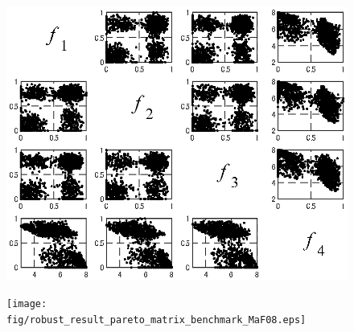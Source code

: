 \begin{figure}[htbp]
\begin{center}
\begin{minipage}{0.45\textwidth}
\begin{center}
            \end{center}
        \end{minipage}
        \begin{minipage}{0.45\textwidth}
            \begin{center}
                \includegraphics[width=1\textwidth,keepaspectratio=true]{fig/robust_result_pareto_matrix_benchmark_DTLZ7.eps}\\\vspace{-5mm}{\small (e)DTLZ7問題}
            \end{center}
        \end{minipage}
        \begin{minipage}{0.45\textwidth}
            \begin{center}
                \texttt{[image: fig/robust\_result\_pareto\_matrix\_benchmark\_MaF08.eps]}\\\vspace{-5mm}{\small (f)MaF08問題}
            \end{center}
        \end{minipage}
        \begin{minipage}{0.45\textwidth}
            \begin{center}

\end{center}
\end{minipage}
\end{center}
\end{figure}
